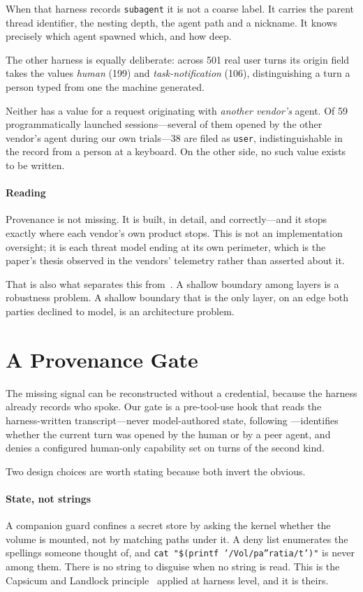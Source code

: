 \documentclass[conference]{IEEEtran}
\begin{document}
When that harness records \texttt{subagent} it is not a coarse label. It carries
the parent thread identifier, the nesting depth, the agent path and a nickname.
It knows precisely which agent spawned which, and how deep.

The other harness is equally deliberate: across 501 real user turns its origin
field takes the values \emph{human} (199) and \emph{task-notification} (106),
distinguishing a turn a person typed from one the machine generated.

Neither has a value for a request originating with \emph{another vendor's} agent.
Of 59 programmatically launched sessions---several of them opened by the other
vendor's agent during our own trials---38 are filed as \texttt{user},
indistinguishable in the record from a person at a keyboard. On the other side,
no such value exists to be written.

\paragraph{Reading} Provenance is not missing. It is built, in detail, and
correctly---and it stops exactly where each vendor's own product stops. This is
not an implementation oversight; it is each threat model ending at its own
perimeter, which is the paper's thesis observed in the vendors' telemetry rather
than asserted about it.

That is also what separates this from~\cite{qi2024shallow}. A shallow boundary
among layers is a robustness problem. A shallow boundary that is the only layer,
on an edge both parties declined to model, is an architecture problem.

\section{A Provenance Gate}\label{sec:gate}

The missing signal can be reconstructed without a credential, because the harness
already records who spoke. Our gate is a pre-tool-use hook that reads the
harness-written transcript---never model-authored state, following
\cite{camel}---identifies whether the current turn was opened by the human or by
a peer agent, and denies a configured human-only capability set on turns of the
second kind.

Two design choices are worth stating because both invert the obvious.

\paragraph{State, not strings} A companion guard confines a secret store by
asking the kernel whether the volume is mounted, not by matching paths under it.
A deny list enumerates the spellings someone thought of, and
\texttt{cat "\$(printf '/Vol/pa''ratia/t')"} is never among them. There is no
string to disguise when no string is read. This is the Capsicum and Landlock
principle~\cite{capsicum,landlock} applied at harness level, and it is theirs.
\end{document}
